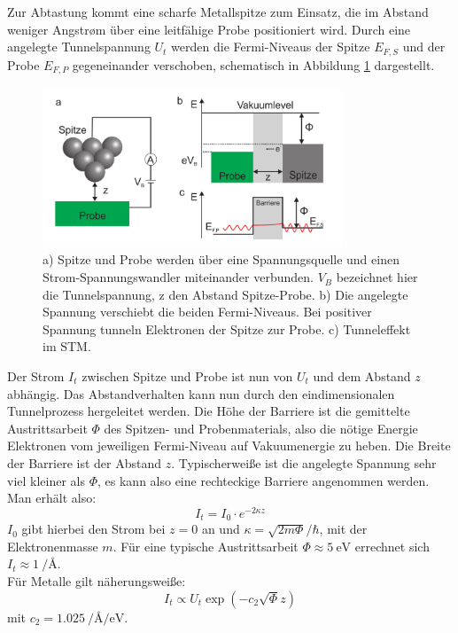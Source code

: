 Zur Abtastung kommt eine scharfe Metallspitze zum Einsatz, die im Abstand weniger
Angstrøm über eine leitfähige Probe positioniert wird. Durch eine angelegte 
Tunnelspannung $U_t$ werden die Fermi-Niveaus der Spitze $E_{F,S}$ und der Probe
$E_{F,P}$ gegeneinander verschoben, schematisch in Abbildung \ref{tunnelstm} 
dargestellt.
\begin{figure}
    \centering
    \includegraphics[width=0.8\textwidth]{Abb/tunnel_stm.png}
    \caption{a) Spitze und Probe werden über eine Spannungsquelle und einen 
                Strom-Spannungswandler miteinander verbunden. $V_B$ bezeichnet
                hier die Tunnelspannung, z den Abstand Spitze-Probe.
             b) Die angelegte Spannung verschiebt die beiden Fermi-Niveaus. Bei 
                positiver Spannung tunneln Elektronen der Spitze zur Probe.
             c) Tunneleffekt im STM.
             \cite{hofmann}}
    \label{tunnelstm}
\end{figure}
Der Strom $I_t$ zwischen Spitze und Probe ist nun von $U_t$ und dem Abstand $z$ 
abhängig. Das Abstandverhalten kann nun durch den eindimensionalen Tunnelprozess
hergeleitet werden. Die Höhe der Barriere ist die gemittelte Austrittsarbeit $\Phi$
des Spitzen- und Probenmaterials, also die nötige Energie Elektronen vom jeweiligen
Fermi-Niveau auf Vakuumenergie zu heben. Die Breite der Barriere ist der Abstand $z$.
Typischerweiße ist die angelegte Spannung sehr viel kleiner als $\Phi$, es kann also
eine rechteckige Barriere angenommen werden. Man erhält also:
\[
    I_t = I_0 \cdot e^{-2\kappa z}    
\]
$I_0$ gibt hierbei den Strom bei $z=0$ an und $\kappa = \sqrt{2m \Phi}/ \hbar$, mit
der Elektronenmasse $m$. Für eine typische Austrittsarbeit $\Phi \approx \SI{5}{\eV}$
errechnet sich $I_t \approx \SI{1}{\per \angstrom}$.\\
Für Metalle gilt näherungsweiße:
\[
    I_t \propto U_t \exp(-c_2 \sqrt{\Phi} z)
\]
mit $c_2 = \SI{1,025}{\per\angstrom\per\eV}$.
\cite{schwabl,hofmann}

